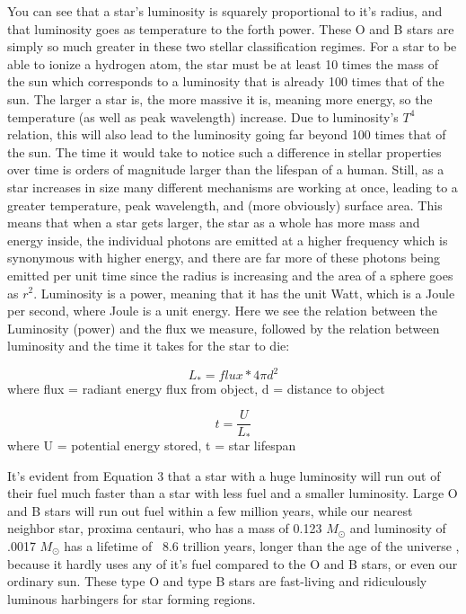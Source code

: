 \documentclass[modern]{aastex63}
\begin{document}
You can see that a star's luminosity is squarely proportional to it's radius, and that luminosity goes as temperature to the forth power. These O and B stars are simply so much greater in these two stellar classification regimes. For a star to be able to ionize a hydrogen atom, the star must be at least 10 times the mass of the sun which corresponds to a luminosity that is already 100 times that of the sun. The larger a star is, the more massive it is, meaning more energy, so the temperature (as well as peak wavelength) increase. Due to luminosity's $T^4$ relation, this will also lead to the luminosity going far beyond 100 times that of the sun. The time it would take to notice such a difference in stellar properties over time is orders of magnitude larger than the lifespan of a human. Still, as a star increases in size many different mechanisms are working at once, leading to a greater temperature, peak wavelength, and (more obviously) surface area. This means that when a star gets larger, the star as a whole has more mass and energy inside, the individual photons are emitted at a higher frequency which is synonymous with higher energy, and there are far more of these photons being emitted per unit time since the radius is increasing and the area of a sphere goes as $r^2$. Luminosity is a power, meaning that it has the unit Watt, which is a Joule per second, where Joule is a unit energy. Here we see the relation between the Luminosity (power) and the flux we measure, followed by the relation between luminosity and the time it takes for the star to die:

\begin{equation}\label{'Equation 2'}
L_* = flux * 4 \pi d^2
\end{equation} where flux = radiant energy flux from object, d = distance to object

\begin{equation}\label{'Equation 3'}
t = \frac{U}{L_*}
\end{equation} where U = potential energy stored, t = star lifespan \citep{2000A&A...364..217D}

It's evident from Equation 3 that a star with a huge luminosity will run out of their fuel much faster than a star with less fuel and a smaller luminosity. Large O and B stars will run out fuel within a few million years, while our nearest neighbor star, proxima centauri, who has a mass of 0.123 $M_{\odot}$ and luminosity of .0017 $M_{\odot}$ has a lifetime of ~8.6 trillion years, longer than the age of the universe \citep{2018ApJ...864...75K}, because it hardly uses any of it's fuel compared to the O and B stars, or even our ordinary sun. These type O and type B stars are fast-living and ridiculously luminous harbingers for star forming regions.
\bigskip
\end{document}
